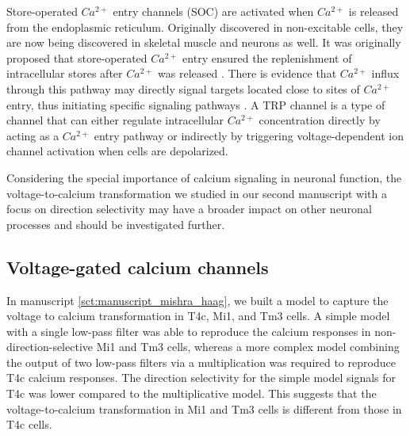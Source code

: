 Store-operated $Ca^{2+}$ entry channels (SOC) are activated when $Ca^{2+}$ is released from the endoplasmic reticulum. Originally discovered in non-excitable cells, they are now being discovered in skeletal muscle and neurons as well. It was originally proposed that store-operated $Ca^{2+}$ entry ensured the replenishment of intracellular stores after $Ca^{2+}$ was released \parencite{Putney1986}. There is evidence that $Ca^{2+}$ influx through this pathway may directly signal targets located close to sites of $Ca^{2+}$ entry, thus initiating specific signaling pathways \parencite{Feske2011}. 
A TRP channel is a type of channel that can either regulate intracellular $Ca^{2+}$ concentration directly by acting as a $Ca^{2+}$ entry pathway or indirectly by triggering voltage-dependent ion channel activation when cells are depolarized.

Considering the special importance of calcium signaling in neuronal function, the voltage-to-calcium transformation we studied in our second manuscript with a focus on direction selectivity may have a broader impact on other neuronal processes and should be investigated further.

\subsection{Voltage-gated calcium channels}

In manuscript \ref{sct:manuscript_mishra_haag}, we built a model to capture the voltage to calcium transformation in T4c, Mi1, and Tm3 cells. A simple model with a single low-pass filter was able to reproduce the calcium responses in non-direction-selective Mi1 and Tm3 cells, whereas a more complex model combining the output of two low-pass filters via a multiplication was required to reproduce T4c calcium responses. The direction selectivity for the simple model signals for T4c was lower compared to the multiplicative model. This suggests that the voltage-to-calcium transformation in Mi1 and Tm3 cells is different from those in T4c cells. 

